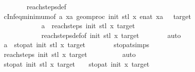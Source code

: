 \begin{isabellebody}
\ \ \ \ \ \ \isamarkupfalse%
\ reach{\isacharunderscore}{\kern0pt}steps{\isacharunderscore}{\kern0pt}def\isanewline
\ \ \ \ \ \ \isamarkupfalse%
\ cInf{\isacharunderscore}{\kern0pt}eq{\isacharunderscore}{\kern0pt}minimum{\isacharbrackleft}{\kern0pt}of\ a{\isacharprime}{\kern0pt}\ {\isachardoublequoteopen}{\isacharbraceleft}{\kern0pt}xa{\isachardot}{\kern0pt}\ geom{\isacharunderscore}{\kern0pt}proc\ init{\isacharprime}{\kern0pt}\ {\isacharparenleft}{\kern0pt}stl\ x{\isacharparenright}{\kern0pt}\ {\isacharparenleft}{\kern0pt}enat\ xa{\isacharparenright}{\kern0pt}\ {\isasymin}\ {\isacharbraceleft}{\kern0pt}{}{\isacharcomma}{\kern0pt}\ target{\isacharbraceright}{\kern0pt}{\isacharbraceright}{\kern0pt}{\isachardoublequoteclose}{\isacharbrackright}{\kern0pt}\isanewline
\ \ \ \ \ \ \ \ \ \ \ \ {\isacartoucheopen}a{\isacharprime}{\kern0pt}\ {\isasymin}\ reach{\isacharunderscore}{\kern0pt}steps\ init{\isacharprime}{\kern0pt}\ {\isacharparenleft}{\kern0pt}stl\ x{\isacharparenright}{\kern0pt}\ target{\isacartoucheclose}\isanewline
\ \ \ \ \ \ \ \ \ \ \ \ reach{\isacharunderscore}{\kern0pt}steps{\isacharunderscore}{\kern0pt}def{\isacharbrackleft}{\kern0pt}of\ init{\isacharprime}{\kern0pt}\ {\isachardoublequoteopen}stl\ x{\isachardoublequoteclose}\ target{\isacharbrackright}{\kern0pt}\isanewline
\ \ \ \ \ \ \isamarkupfalse%
\ auto\isanewline
\ \ \ \ \isamarkupfalse%
\ \isamarkupfalse%
\ {\isachardoublequoteopen}a{\isacharprime}{\kern0pt}\ {\isacharequal}{\kern0pt}\ stop{\isacharunderscore}{\kern0pt}at\ init{\isacharprime}{\kern0pt}\ {\isacharparenleft}{\kern0pt}stl\ x{\isacharparenright}{\kern0pt}\ target{\isachardoublequoteclose}\isanewline
\ \ \ \ \ \ \isamarkupfalse%
\ stop{\isacharunderscore}{\kern0pt}at{\isachardot}{\kern0pt}simps\isanewline
\ \ \ \ \ \ \isamarkupfalse%
\ {\isacartoucheopen}reach{\isacharunderscore}{\kern0pt}steps\ init{\isacharprime}{\kern0pt}\ {\isacharparenleft}{\kern0pt}stl\ x{\isacharparenright}{\kern0pt}\ target\ {\isasymnoteq}\ {\isacharbraceleft}{\kern0pt}{\isacharbraceright}{\kern0pt}{\isacartoucheclose}\isanewline
\ \ \ \ \ \ \isamarkupfalse%
\ auto\isanewline
\ \ \ \ \isamarkupfalse%
\ \isamarkupfalse%
\ {\isachardoublequoteopen}stop{\isacharunderscore}{\kern0pt}at\ init{\isacharprime}{\kern0pt}\ {\isacharparenleft}{\kern0pt}stl\ x{\isacharparenright}{\kern0pt}\ target\ {\isacharplus}{\kern0pt}\ {}\ {\isacharequal}{\kern0pt}\ stop{\isacharunderscore}{\kern0pt}at\ init\ x\ target{\isachardoublequoteclose}\isanewline

\end{isabellebody}
